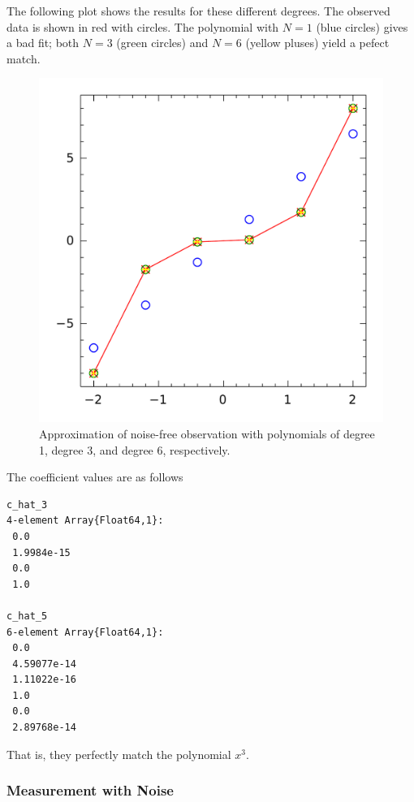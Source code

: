 The following plot shows the results for these different degrees. The observed data is shown in red with circles. The polynomial with $N=1$ (blue circles) gives a bad fit; both $N=3$ (green circles) and $N = 6$ (yellow pluses) yield a pefect match.

\begin{figure}[htb!]
\centering
\includegraphics[scale=0.5]{images/ls_polyfit_no_noise.pdf}
\caption{Approximation of noise-free observation with polynomials of degree 1, degree 3, and degree 6, respectively.}
\end{figure}

The coefficient values are as follows

\begin{verbatim}
c_hat_3
4-element Array{Float64,1}:
 0.0       
 1.9984e-15
 0.0       
 1.0

c_hat_5
6-element Array{Float64,1}:
 0.0        
 4.59077e-14
 1.11022e-16
 1.0        
 0.0        
 2.89768e-14

\end{verbatim}

That is, they perfectly match the polynomial $x^3$.


\subsubsection{Measurement with Noise}


